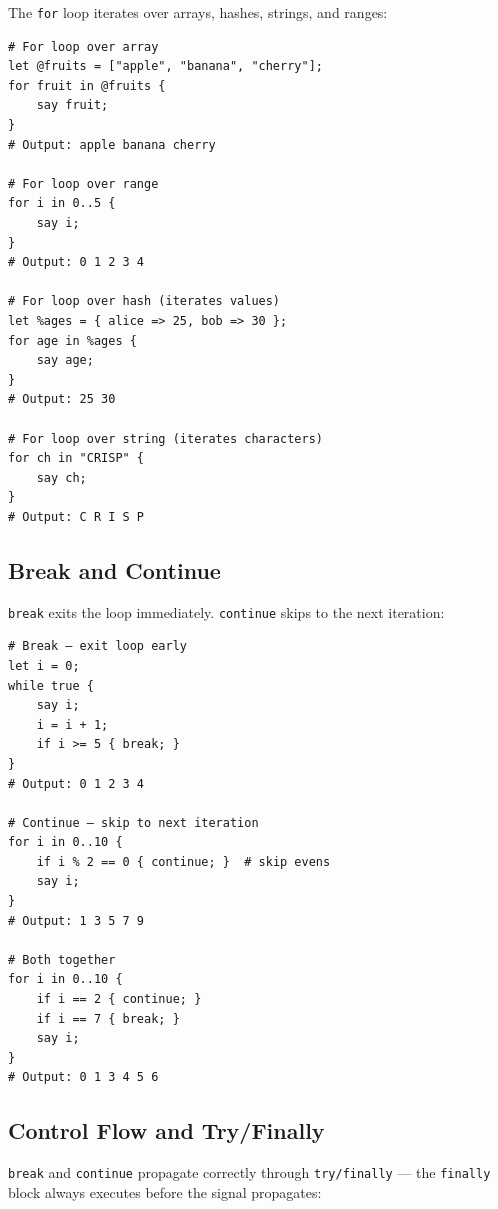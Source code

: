 The \texttt{for} loop iterates over arrays, hashes, strings, and ranges:

\begin{tcolorbox}[colback=codebg, colframe=darkpurple, colbacktitle=darkpurple, title=\textbf{\textcolor{codegold}{For Loops}}, fonttitle=\bfseries, sharp corners]
\begin{lstlisting}
# For loop over array
let @fruits = ["apple", "banana", "cherry"];
for fruit in @fruits {
    say fruit;
}
# Output: apple banana cherry

# For loop over range
for i in 0..5 {
    say i;
}
# Output: 0 1 2 3 4

# For loop over hash (iterates values)
let %ages = { alice => 25, bob => 30 };
for age in %ages {
    say age;
}
# Output: 25 30

# For loop over string (iterates characters)
for ch in "CRISP" {
    say ch;
}
# Output: C R I S P
\end{lstlisting}
\end{tcolorbox}

\subsection{Break and Continue}

\texttt{break} exits the loop immediately. \texttt{continue} skips to the next iteration:

\begin{tcolorbox}[colback=codebg, colframe=darkpurple, colbacktitle=darkpurple, title=\textbf{\textcolor{codegold}{Break and Continue}}, fonttitle=\bfseries, sharp corners]
\begin{lstlisting}
# Break — exit loop early
let i = 0;
while true {
    say i;
    i = i + 1;
    if i >= 5 { break; }
}
# Output: 0 1 2 3 4

# Continue — skip to next iteration
for i in 0..10 {
    if i % 2 == 0 { continue; }  # skip evens
    say i;
}
# Output: 1 3 5 7 9

# Both together
for i in 0..10 {
    if i == 2 { continue; }
    if i == 7 { break; }
    say i;
}
# Output: 0 1 3 4 5 6
\end{lstlisting}
\end{tcolorbox}

\subsection{Control Flow and Try/Finally}

\texttt{break} and \texttt{continue} propagate correctly through \texttt{try/finally} — the \texttt{finally} block always executes before the signal propagates:

